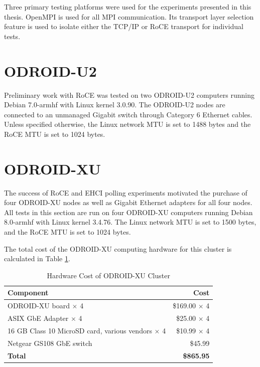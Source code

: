 \documentclass[11pt]{book}
\begin{document}
Three primary testing platforms were used for the experiments presented in this thesis.
OpenMPI is used for all MPI communication.  Its transport layer selection feature is used
to isolate either the TCP/IP or RoCE transport for individual tests.

\section{ODROID-U2}

Preliminary work with RoCE was tested on two ODROID-U2 computers running Debian 7.0-armhf
with Linux kernel 3.0.90.  The ODROID-U2 nodes are connected to an unmanaged Gigabit
switch through Category 6 Ethernet cables.  Unless specified otherwise, the Linux network
MTU is set to 1488 bytes and the RoCE MTU is set to 1024 bytes.

\section{ODROID-XU}

The success of RoCE and EHCI polling experiments motivated the purchase of four ODROID-XU
nodes as well as Gigabit Ethernet adapters for all four nodes.  All tests in this section
are run on four ODROID-XU computers running Debian 8.0-armhf with Linux kernel 3.4.76.
The Linux network MTU is set to 1500 bytes, and the RoCE MTU is set to 1024 bytes.

The total cost of the ODROID-XU computing hardware for this cluster is calculated in Table
\ref{xu-cost-table}.

\begin{table}
  \caption{Hardware Cost of ODROID-XU Cluster}\label{xu-cost-table}
  \centering
  \begin{tabular}{| l | r |}
    \hline
    \textbf{Component} & \textbf{Cost} \\ \hline
    ODROID-XU board $\times$ 4 & \$169.00 $\times$ 4 \\
    ASIX GbE Adapter $\times$ 4 & \$25.00 $\times$ 4 \\
    16 GB Class 10 MicroSD card, various vendors $\times$ 4 & \$10.99 $\times$ 4 \\
    Netgear GS108 GbE switch & \$45.99 \\
    \hline
    \textbf{Total} & \textbf{\$865.95} \\ \hline
  \end{tabular}
\end{table}
\end{document}

